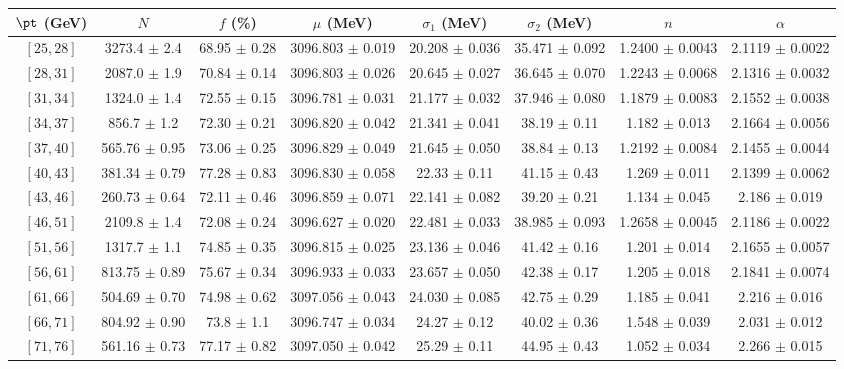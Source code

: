 \begin{tabular}{c||c|c|c|c|c|c|c}
$\pt$ (GeV) & $N$ & $f$ (\%) & $\mu$ (MeV) & $\sigma_1$ (MeV) & $\sigma_2$ (MeV) & $n$ & $\alpha$ \\
\hline
$[25, 28]$ & 3273.4 $\pm$ 2.4 & 68.95 $\pm$ 0.28 & 3096.803 $\pm$ 0.019 & 20.208 $\pm$ 0.036 & 35.471 $\pm$ 0.092 & 1.2400 $\pm$ 0.0043 & 2.1119 $\pm$ 0.0022\\
$[28, 31]$ & 2087.0 $\pm$ 1.9 & 70.84 $\pm$ 0.14 & 3096.803 $\pm$ 0.026 & 20.645 $\pm$ 0.027 & 36.645 $\pm$ 0.070 & 1.2243 $\pm$ 0.0068 & 2.1316 $\pm$ 0.0032\\
$[31, 34]$ & 1324.0 $\pm$ 1.4 & 72.55 $\pm$ 0.15 & 3096.781 $\pm$ 0.031 & 21.177 $\pm$ 0.032 & 37.946 $\pm$ 0.080 & 1.1879 $\pm$ 0.0083 & 2.1552 $\pm$ 0.0038\\
$[34, 37]$ & 856.7 $\pm$ 1.2 & 72.30 $\pm$ 0.21 & 3096.820 $\pm$ 0.042 & 21.341 $\pm$ 0.041 & 38.19 $\pm$ 0.11 & 1.182 $\pm$ 0.013 & 2.1664 $\pm$ 0.0056\\
$[37, 40]$ & 565.76 $\pm$ 0.95 & 73.06 $\pm$ 0.25 & 3096.829 $\pm$ 0.049 & 21.645 $\pm$ 0.050 & 38.84 $\pm$ 0.13 & 1.2192 $\pm$ 0.0084 & 2.1455 $\pm$ 0.0044\\
$[40, 43]$ & 381.34 $\pm$ 0.79 & 77.28 $\pm$ 0.83 & 3096.830 $\pm$ 0.058 & 22.33 $\pm$ 0.11 & 41.15 $\pm$ 0.43 & 1.269 $\pm$ 0.011 & 2.1399 $\pm$ 0.0062\\
$[43, 46]$ & 260.73 $\pm$ 0.64 & 72.11 $\pm$ 0.46 & 3096.859 $\pm$ 0.071 & 22.141 $\pm$ 0.082 & 39.20 $\pm$ 0.21 & 1.134 $\pm$ 0.045 & 2.186 $\pm$ 0.019\\
$[46, 51]$ & 2109.8 $\pm$ 1.4 & 72.08 $\pm$ 0.24 & 3096.627 $\pm$ 0.020 & 22.481 $\pm$ 0.033 & 38.985 $\pm$ 0.093 & 1.2658 $\pm$ 0.0045 & 2.1186 $\pm$ 0.0022\\
$[51, 56]$ & 1317.7 $\pm$ 1.1 & 74.85 $\pm$ 0.35 & 3096.815 $\pm$ 0.025 & 23.136 $\pm$ 0.046 & 41.42 $\pm$ 0.16 & 1.201 $\pm$ 0.014 & 2.1655 $\pm$ 0.0057\\
$[56, 61]$ & 813.75 $\pm$ 0.89 & 75.67 $\pm$ 0.34 & 3096.933 $\pm$ 0.033 & 23.657 $\pm$ 0.050 & 42.38 $\pm$ 0.17 & 1.205 $\pm$ 0.018 & 2.1841 $\pm$ 0.0074\\
$[61, 66]$ & 504.69 $\pm$ 0.70 & 74.98 $\pm$ 0.62 & 3097.056 $\pm$ 0.043 & 24.030 $\pm$ 0.085 & 42.75 $\pm$ 0.29 & 1.185 $\pm$ 0.041 & 2.216 $\pm$ 0.016\\
$[66, 71]$ & 804.92 $\pm$ 0.90 & 73.8 $\pm$ 1.1 & 3096.747 $\pm$ 0.034 & 24.27 $\pm$ 0.12 & 40.02 $\pm$ 0.36 & 1.548 $\pm$ 0.039 & 2.031 $\pm$ 0.012\\
$[71, 76]$ & 561.16 $\pm$ 0.73 & 77.17 $\pm$ 0.82 & 3097.050 $\pm$ 0.042 & 25.29 $\pm$ 0.11 & 44.95 $\pm$ 0.43 & 1.052 $\pm$ 0.034 & 2.266 $\pm$ 0.015\\

\end{tabular}
